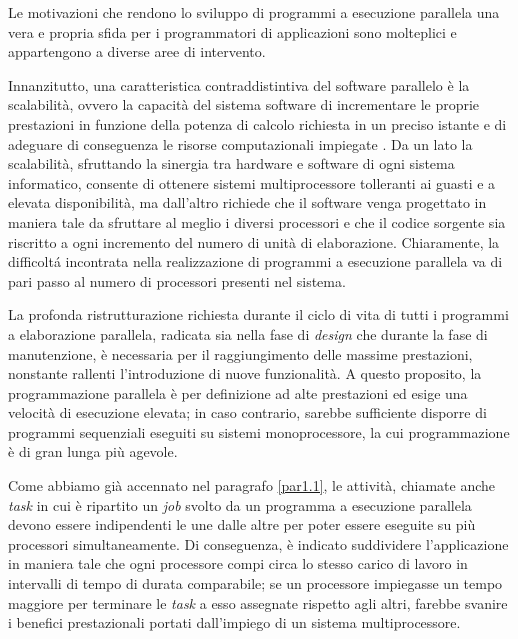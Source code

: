 Le motivazioni che rendono lo sviluppo di programmi a esecuzione parallela una vera e propria sfida per i programmatori
di applicazioni sono molteplici e appartengono a diverse aree di intervento.

Innanzitutto, una caratteristica contraddistintiva del software parallelo
\`e la scalabilit\`a, ovvero la capacit\`a del sistema software di incrementare le proprie prestazioni in funzione della potenza
di calcolo richiesta in un preciso istante e di adeguare di conseguenza le risorse computazionali impiegate \cite{Michael2007}.\newline
Da un lato la scalabilit\`a, sfruttando la sinergia tra hardware e software di ogni sistema informatico, consente di ottenere
sistemi multiprocessore tolleranti ai guasti e a elevata disponibilit\`a, ma dall'altro richiede che il software venga progettato
in maniera tale da sfruttare al meglio i diversi processori e che il codice sorgente sia riscritto a ogni
incremento del numero di unit\`a di elaborazione.\newline
Chiaramente, la difficolt\'a incontrata nella realizzazione di programmi a esecuzione parallela va di pari passo al numero
di processori presenti nel sistema.

La profonda ristrutturazione richiesta durante il ciclo di vita di tutti i  programmi a elaborazione parallela, radicata sia nella
fase di \textit{design} che durante la fase di manutenzione, \`e necessaria per il raggiungimento delle massime prestazioni, nonstante rallenti l'introduzione di nuove funzionalit\`a.\newline
A questo proposito, la programmazione parallela \`e per definizione ad alte prestazioni ed esige una
velocit\`a di esecuzione elevata; in caso contrario, sarebbe sufficiente disporre di programmi sequenziali eseguiti su sistemi monoprocessore, la cui programmazione \`e di gran lunga pi\`u agevole.

Come abbiamo gi\`a accennato nel paragrafo \ref{par1.1}, le attivit\`a, chiamate anche \textit{task} in cui \`e ripartito un \textit{job} svolto da un
programma a esecuzione parallela devono essere indipendenti le une dalle altre per poter essere eseguite su pi\`u processori simultaneamente.\newline
Di conseguenza, \`e indicato suddividere l'applicazione in maniera tale che ogni processore compi circa lo stesso carico di lavoro in intervalli
di tempo di durata comparabile; se un processore impiegasse un tempo maggiore per terminare le \textit{task} a esso assegnate rispetto agli altri, farebbe svanire i benefici prestazionali portati
dall'impiego di un sistema multiprocessore.

